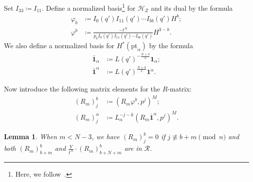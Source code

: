 \documentclass[10pt]{amsart}
\newtheorem{lem}[thm]{Lemma}
\theoremstyle{definition}
\theoremstyle{remark}
\theoremstyle{plain}
\theoremstyle{definition}
\theoremstyle{remark}
\newcommand{\msc}[1]{\mathscr{#1}}
\newcommand{\mr}[1]{\mathrm{#1}}
\newcommand{\1}{\mathbf{1}}
\newcommand{\2}{\mathbf{2}}
\newcommand{\3}{\mathbf{3}}
\newcommand{\pt}{\mr{pt}}
\numberwithin{equation}{section}
\begin{document}
Set $I_{33} \coloneqq I_{11}$.
Define a normalized basis\footnote{Here, we follow~\cite[\S 5.2]{nmsp2}.} for $\msc{H}_Z$ and its dual by the formula
\begin{align*}
    \varphi_b &\coloneqq I_0(q') I_{11}(q') \cdots I_{bb}(q')H^b; \\
    \varphi^b &\coloneqq\frac{-t^N}{p_k I_0(q') I_{11}(q') \cdots I_{bb}(q')}H^{3-b}.
\end{align*}
We also define a normalized basis for $H^*(\pt_{\alpha})$ by the formula
\begin{align*}
    \bar{\1}_{\alpha} &\coloneqq L(q')^{-\frac{N+3}{2}} \1_{\alpha}; \\
    \bar{\1}^{\alpha} &\coloneqq L(q')^{\frac{N+3}{2}} \1^{\alpha}.
\end{align*}

Now introduce the following matrix elements for the $R$-matrix:
\begin{align*}
    (R_m)_j^b &\coloneqq (R_m \varphi^b, p^j)^M; \\
    (R_m)_j^{\alpha} &\coloneqq L_{\alpha}^{-j-k} (R_m \bar{\1}^{\alpha}, p^j)^M.
\end{align*}

\begin{lem}\label{lem:level0polynomiality}
    When $m < N-3$, we have $(R_m)_j^b = 0$ if $j \not\equiv b+m \pmod{n}$ and both $(R_m)_{b+m}^b$ and $\frac{Y}{t^N} \cdot (R_m)_{b+N+m}^b$ are in $\msc{R}$.
\end{lem}
\end{document}
